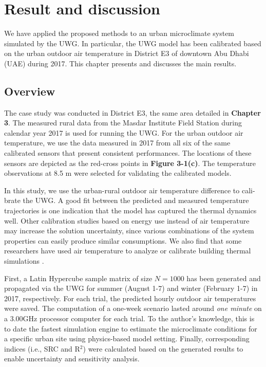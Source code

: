 \chapter{Result and discussion}

%

We have applied the proposed methods to an urban microclimate system simulated by the UWG. In particular, the UWG model has been calibrated based on the urban outdoor air temperature in District E3 of downtown Abu Dhabi (UAE) during 2017. This chapter presents and discusses the main results.

\section{Overview}

The case study was conducted in District E3, the same area detailed in \textbf{Chapter 3}. The measured rural data from the Masdar Institute Field Station during calendar year 2017 is used for running the UWG. For the urban outdoor air temperature, we use the data measured in 2017 from all six of the same calibrated sensors that present consistent performances. The locations of these sensors are depicted as the red-cross points in \textbf{Figure 3-1(c)}. The temperature observations at 8.5 m were selected for validating the calibrated models.

In this study, we use the urban-rural outdoor air temperature difference to cali-brate the UWG. A good fit between the predicted and measured temperature trajectories is one indication that the model has captured the thermal dynamics well. Other calibration studies based on energy use instead of air temperature may increase the solution uncertainty, since various combinations of the system properties can easily produce similar consumptions. We also find that some researchers have used air temperature to analyze or calibrate building thermal simulations \cite{ruiz2016genetic,ruiz2017analysis,spitz2012practical,cornaro2015thermal}.

First, a Latin Hypercube sample matrix of size $N = 1000$ has been generated and propagated via the UWG for summer (August 1-7) and winter (February 1-7) in 2017, respectively. For each trial, the predicted hourly outdoor air temperatures were saved. The computation of a one-week scenario lasted around \textit{one minute} on a 3.00GHz processor computer for each trial. To the author's knowledge, this is to date the fastest simulation engine to estimate the microclimate conditions for a specific urban site using physics-based model setting. Finally, corresponding indices (i.e., SRC and R$^2$) were calculated based on the generated results to enable uncertainty and sensitivity analysis.

